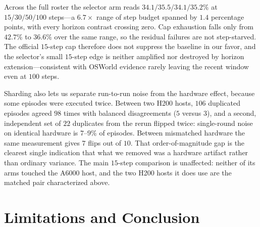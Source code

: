 \documentclass[letterpaper]{article} %
\begin{document}
Across the full roster the selector arm reads
$34.1/35.5/34.1/35.2\%$ at $15/30/50/100$ steps---a $6.7\times$ range of
step budget spanned by $1.4$ percentage points, with every horizon
contrast crossing zero. Cap exhaustion falls only from $42.7\%$ to
$36.6\%$ over the same range, so the residual failures are not
step-starved. The official $15$-step cap therefore does not suppress the
baseline in our favor, and the selector's small $15$-step edge is
neither amplified nor destroyed by horizon extension---consistent with
OSWorld evidence rarely leaving the recent window even at $100$ steps.

Sharding also lets us separate run-to-run noise from the hardware
effect, because some episodes were executed twice. Between two H200
hosts, $106$ duplicated episodes agreed $98$ times with balanced
disagreements ($5$ versus $3$), and a second, independent set of $22$
duplicates from the rerun flipped twice: single-round noise on identical
hardware is $7$--$9\%$ of episodes. Between mismatched hardware the same
measurement gives $7$ flips out of $10$. That order-of-magnitude gap is
the clearest single indication that what we removed was a hardware
artifact rather than ordinary variance. The main $15$-step comparison is
unaffected: neither of its arms touched the A6000 host, and the two H200
hosts it does use are the matched pair characterized above.

\section{Limitations and Conclusion}
\end{document}
